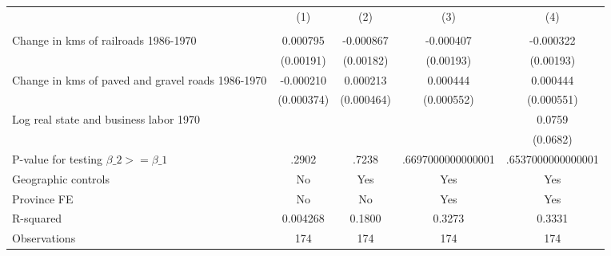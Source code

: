 {
\def\sym#1{\ifmmode^{#1}\else\(^{#1}\)\fi}
\begin{tabular}{l*{4}{c}}
\hline\hline
                &\multicolumn{1}{c}{(1)}&\multicolumn{1}{c}{(2)}&\multicolumn{1}{c}{(3)}&\multicolumn{1}{c}{(4)}\\
                &\multicolumn{1}{c}{}&\multicolumn{1}{c}{}&\multicolumn{1}{c}{}&\multicolumn{1}{c}{}\\
\hline
Change in kms of railroads 1986-1970& 0.000795         &-0.000867         &-0.000407         &-0.000322         \\
                &(0.00191)         &(0.00182)         &(0.00193)         &(0.00193)         \\
[1em]
Change in kms of paved and gravel roads 1986-1970&-0.000210         & 0.000213         & 0.000444         & 0.000444         \\
                &(0.000374)         &(0.000464)         &(0.000552)         &(0.000551)         \\
[1em]
Log real state and business labor 1970&                  &                  &                  &   0.0759         \\
                &                  &                  &                  & (0.0682)         \\
\hline
P-value for testing $\beta\_{2} >= \beta\_{1}$&    .2902         &    .7238         &.6697000000000001         &.6537000000000001         \\
Geographic controls&       No         &      Yes         &      Yes         &      Yes         \\
Province FE     &       No         &       No         &      Yes         &      Yes         \\
R-squared       & 0.004268         &   0.1800         &   0.3273         &   0.3331         \\
Observations    &      174         &      174         &      174         &      174         \\
\hline\hline
\end{tabular}
}
